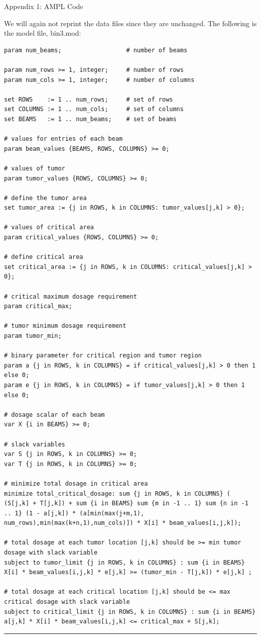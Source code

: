 \documentclass[12pt]{article}
\makeatletter
\newenvironment{task}{\@startsection
       {section}{1}
       {0.4em}{-.5ex plus -1ex minus -.2ex}{.5ex plus .2ex}
       {\pagebreak[3]\large\bf\noindent{Task}}}
       {\nopagebreak[3]\vspace{3ex}\begin{center}\rule{1\linewidth}{.3pt}\end{center}}
\makeatother
\begin{document}
\begin{task}{Appendix 1: AMPL Code}
\begin{enumerate}
We will again not reprint the data files since they are unchanged. The following is the model file, bin3.mod:

\begin{lstlisting}
param num_beams;                  # number of beams

param num_rows >= 1, integer;     # number of rows
param num_cols >= 1, integer;     # number of columns 

set ROWS    := 1 .. num_rows;	  # set of rows
set COLUMNS := 1 .. num_cols;	  # set of columns
set BEAMS   := 1 .. num_beams;    # set of beams

# values for entries of each beam
param beam_values {BEAMS, ROWS, COLUMNS} >= 0; 

# values of tumor
param tumor_values {ROWS, COLUMNS} >= 0; 

# define the tumor area 
set tumor_area := {j in ROWS, k in COLUMNS: tumor_values[j,k] > 0};

# values of critical area
param critical_values {ROWS, COLUMNS} >= 0; 

# define critical area 
set critical_area := {j in ROWS, k in COLUMNS: critical_values[j,k] > 0};

# critical maximum dosage requirement
param critical_max;

# tumor minimum dosage requirement
param tumor_min;

# binary parameter for critical region and tumor region
param a {j in ROWS, k in COLUMNS} = if critical_values[j,k] > 0 then 1 else 0;
param e {j in ROWS, k in COLUMNS} = if tumor_values[j,k] > 0 then 1 else 0;

# dosage scalar of each beam
var X {i in BEAMS} >= 0;

# slack variables
var S {j in ROWS, k in COLUMNS} >= 0;
var T {j in ROWS, k in COLUMNS} >= 0;

# minimize total dosage in critical area
minimize total_critical_dosage: sum {j in ROWS, k in COLUMNS} ( (S[j,k] + T[j,k]) + sum {i in BEAMS} sum {m in -1 .. 1} sum {n in -1 .. 1} (1 - a[j,k]) * (a[min(max(j+m,1), num_rows),min(max(k+n,1),num_cols)]) * X[i] * beam_values[i,j,k]);

# total dosage at each tumor location [j,k] should be >= min tumor dosage with slack variable
subject to tumor_limit {j in ROWS, k in COLUMNS} : sum {i in BEAMS} X[i] * beam_values[i,j,k] * e[j,k] >= (tumor_min - T[j,k]) * e[j,k] ;

# total dosage at each critical location [j,k] should be <= max critical dosage with slack variable
subject to critical_limit {j in ROWS, k in COLUMNS} : sum {i in BEAMS} a[j,k] * X[i] * beam_values[i,j,k] <= critical_max + S[j,k];
\end{lstlisting}


\end{enumerate}
\end{task}
\end{document}
